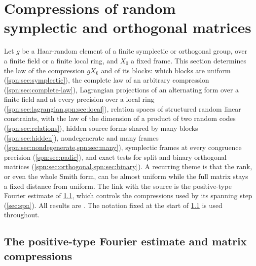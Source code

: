 \providecommand{\spnHS}{\mathrm{HS}}
\providecommand{\spncodim}{\operatorname{codim}}
\providecommand{\spnim}{\operatorname{im}}
\providecommand{\spnE}{\mathbb{E}}
\providecommand{\spnP}{\mathbb{P}}
\providecommand{\spnTV}{d_{\mathrm{TV}}}
\providecommand{\spnStab}{\operatorname{Stab}}
\providecommand{\spnMat}{\operatorname{Mat}}
\providecommand{\spnDD}{\mathfrak{D}}
\providecommand{\spnT}{\mathsf{T}}
\providecommand{\spnqbin}[3]{\genfrac{[}{]}{0pt}{}{#1}{#2}_{#3}}
\providecommand{\spnOrth}{\mathcal{O}}
\providecommand{\spnTame}{\mathcal{T}}
\providecommand{\spnEmb}{\mathcal{E}}
\providecommand{\spnAlt}{\operatorname{Alt}}
\providecommand{\spncoker}{\operatorname{coker}}
\section{Compressions of random symplectic and orthogonal matrices}\label{sec:cmp}

Let $g$ be a Haar-random element of a finite symplectic or orthogonal group, over a finite field
or a finite local ring, and $X_0$ a fixed frame. This section determines the law of the
compression $gX_0$ and of its blocks: which blocks are uniform
(\cref{spn:sec:symplectic}), the complete law of an arbitrary compression
(\cref{spn:sec:complete-law}), Lagrangian projections of an alternating form over a finite field
and at every precision over a local ring (\cref{spn:sec:lagrangian,spn:sec:local}), relation spaces
of structured random linear constraints, with the law of the dimension of a product of two random codes
(\cref{spn:sec:relations}), hidden source forms shared by many blocks (\cref{spn:sec:hidden}), nondegenerate and many frames
(\cref{spn:sec:nondegenerate,spn:sec:many}), symplectic frames at every congruence precision
(\cref{spn:sec:padic}), and exact tests for split and binary orthogonal matrices
(\cref{spn:sec:orthogonal,spn:sec:binary}). A recurring theme is that the rank, or even the
whole Smith form, can be almost uniform while the full matrix stays a fixed distance from
uniform. The link with the source is the positive-type Fourier estimate of
\cref{spn:sec:positive-type}, which controls the compressions used by its spanning step
(\cref{sec:spn}). All results are \stU. The notation fixed at the start of
\cref{spn:sec:positive-type} is used throughout.

\subsection{The positive-type Fourier estimate and matrix compressions}\label{spn:sec:positive-type}

